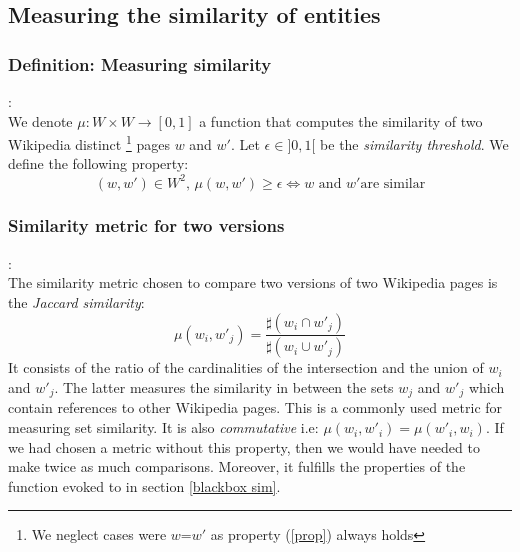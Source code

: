 \documentclass[sigconf]{acmart}
\begin{document}
\subsection{Measuring the similarity of entities}
\subsubsection{Definition: Measuring similarity}:\\
\label{blackbox sim}
We denote $ \mu : W \times W \rightarrow [0,1]$ a function that computes the similarity of two Wikipedia distinct \footnote{We neglect cases were $w$=$w'$ as property (\ref{prop}) always holds} pages $w$ and $w'$. Let $\epsilon \in ]0,1[$ be the \emph{similarity threshold}. We define the following property:
\begin{equation}
    \label{prop}
    (w,w') \in W^{2}, \,\mu (w,w') \geq \epsilon \iff w \text{ and } w' \text{are similar}
\end{equation}

\subsubsection{Similarity metric for two versions}:\\
\label{sim versions}
The similarity metric chosen to compare two versions of two Wikipedia pages is the \emph{Jaccard similarity}:
\begin{equation}
    \label{compare versions}
    \mu (w_i,w'_{j}) = \frac{\sharp(w_i\cap w'_{j})}{\sharp(w_i\cup w'_{j})}
\end{equation}
It consists of the ratio of the cardinalities of the intersection and the union of $w_i$ and $w'_{j}$. The latter measures the similarity in between the sets $w_j$ and $w'_{j}$ which contain references to other Wikipedia pages. This is a commonly used metric for measuring set similarity. It is also \emph{commutative} i.e: $\mu (w_i,w'_{i}) = \mu (w'_{i},w_i)$. If we had chosen a metric without this property, then we would have needed to make twice as much comparisons. Moreover, it fulfills the properties of the function evoked to in section \ref{blackbox sim}.
\end{document}
